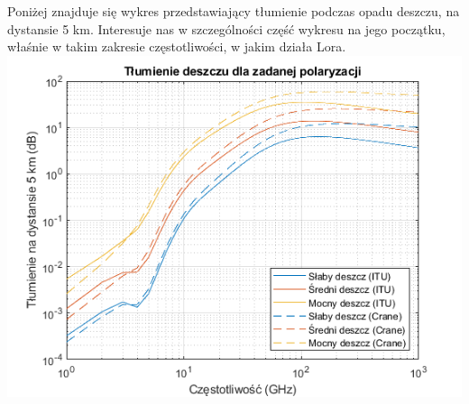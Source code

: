 Poniżej znajduje się wykres przedstawiający tłumienie podczas opadu deszczu, na dystansie 5 km. Interesuje nas w szczególności część wykresu na jego początku, właśnie w takim zakresie częstotliwości, w jakim działa Lora.
\includegraphics{./grafika/num_sim2_tlumienie_podczas_opadu_deszczu.png}

